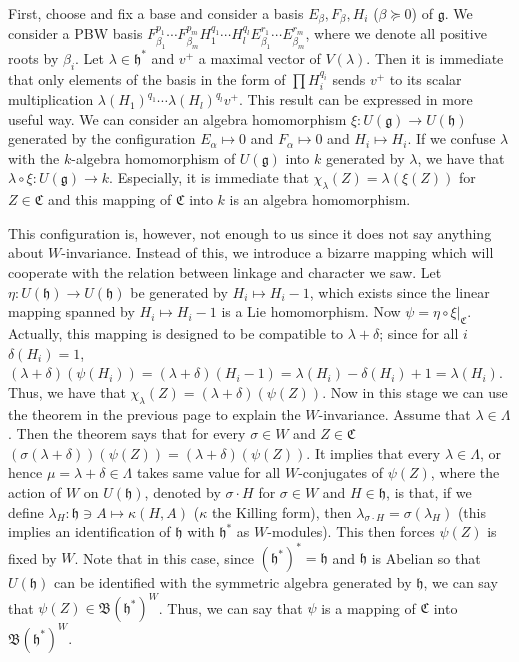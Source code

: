 \documentclass{article}
\newcommand{\lie}[1]{\mathfrak{#1}}
\begin{document}
First, choose and fix a base and consider a basis $E_\beta, F_\beta, H_i$ ($\beta \succeq 0$) of $\lie{g}$.
We consider a PBW basis $F_{\beta_1}^{p_1} \cdots F_{\beta_m}^{p_m} H_1^{q_1} \cdots H_l^{q_l} E_{\beta_1}^{r_1} \cdots E_{\beta_m}^{r_m}$, where we denote all positive roots by $\beta_i$.
Let $\lambda \in \lie{h}^*$ and $v^+$ a maximal vector of $V(\lambda)$.
Then it is immediate that only elements of the basis in the form of $\prod H_i^{q_i}$ sends $v^+$ to its scalar multiplication $\lambda(H_1)^{q_1} \cdots \lambda(H_l)^{q_l} v^+$.
This result can be expressed in more useful way.
We can consider an algebra homomorphism $\xi : U(\lie{g}) \to U(\lie{h})$ generated by the configuration $E_\alpha \mapsto 0$ and $F_\alpha \mapsto 0$ and $H_i \mapsto H_i$.
If we confuse $\lambda$ with the $k$-algebra homomorphism of $U(\lie{g})$ into $k$ generated by $\lambda$, we have that $\lambda \circ \xi : U(\lie{g}) \to k$.
Especially, it is immediate that $\chi_\lambda(Z) = \lambda(\xi(Z))$ for $Z \in \mathfrak{C}$ and this mapping of $\mathfrak{C}$ into $k$ is an algebra homomorphism.

This configuration is, however, not enough to us since it does not say anything about $W$-invariance.
Instead of this, we introduce a bizarre mapping which will cooperate with the relation between linkage and character we saw.
Let $\eta : U(\lie{h}) \to U(\lie{h})$ be generated by $H_i \mapsto H_i - 1$, which exists since the linear mapping spanned by $H_i \mapsto H_i - 1$ is a Lie homomorphism.
Now $\psi = \eta \circ \xi|_\mathfrak{C}$.
Actually, this mapping is designed to be compatible to $\lambda + \delta$; since for all $i$ $\delta(H_i) = 1$, $(\lambda + \delta)(\psi(H_i)) = (\lambda + \delta)(H_i - 1) = \lambda(H_i) - \delta(H_i) + 1 = \lambda(H_i)$.
Thus, we have that $\chi_\lambda(Z) = (\lambda + \delta)(\psi(Z))$.
Now in this stage we can use the theorem in the previous page to explain the $W$-invariance.
Assume that $\lambda \in \Lambda$.
Then the theorem says that for every $\sigma \in W$ and $Z \in \mathfrak{C}$ $(\sigma(\lambda + \delta))(\psi(Z)) = (\lambda + \delta)(\psi(Z))$.
It implies that every $\lambda \in \Lambda$, or hence $\mu = \lambda + \delta \in \Lambda$ takes same value for all $W$-conjugates of $\psi(Z)$, where the action of $W$ on $U(\lie{h})$, denoted by $\sigma \cdot H$ for $\sigma \in W$ and $H \in \lie{h}$, is that, if we define $\lambda_H : \lie{h} \ni A \mapsto \kappa(H, A)$ ($\kappa$ the Killing form), then $\lambda_{\sigma \cdot H} = \sigma(\lambda_H)$ (this implies an identification of $\lie{h}$ with $\lie{h}^*$ as $W$-modules).
This then forces $\psi(Z)$ is fixed by $W$.
Note that in this case, since $(\lie{h}^*)^* = \lie{h}$ and $\lie{h}$ is Abelian so that $U(\lie{h})$ can be identified with the symmetric algebra generated by $\lie{h}$, we can say that $\psi(Z) \in \mathfrak{B}(\lie{h}^*)^W$.
Thus, we can say that $\psi$ is a mapping of $\mathfrak{C}$ into $\mathfrak{B}(\lie{h}^*)^W$.
\end{document}
